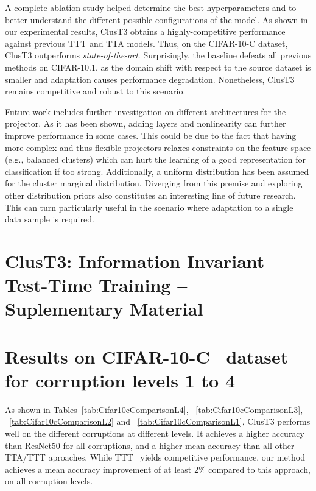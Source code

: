 \documentclass{article}
\begin{document}
A complete ablation study helped determine the best hyperparameters and to better understand the different possible configurations of the model. As shown in our experimental results, ClusT3 obtains a highly-competitive performance against previous TTT and TTA models. Thus, on the CIFAR-10-C dataset, ClusT3 outperforms \emph{state-of-the-art}. Surprisingly, the baseline defeats all previous methods on CIFAR-10.1, as the domain shift with respect to the source dataset is smaller and adaptation causes performance degradation. Nonetheless, ClusT3 remains competitive and robust to this scenario.

Future work includes further investigation on different architectures for the projector. As it has been shown, adding layers and nonlinearity can further improve performance in some cases. This could be due to the fact that having more complex and thus flexible projectors relaxes constraints on the feature space (e.g., balanced clusters) which can hurt the learning of a good representation for classification if too strong. Additionally, a uniform distribution has been assumed for the cluster marginal distribution. Diverging from this premise and exploring other distribution priors also constitutes an interesting line of future research. This can turn particularly useful in the scenario where adaptation to a single data sample is required.

\newpage

\section*{\centering ClusT3: Information Invariant Test-Time Training -- Suplementary Material}

\setcounter{section}{0}

\section{Results on CIFAR-10-C~\cite{cifar10c} dataset for corruption levels 1 to 4}
\label{sec:Results}

As shown in Tables~\ref{tab:Cifar10cComparisonL4}, ~\ref{tab:Cifar10cComparisonL3}, ~\ref{tab:Cifar10cComparisonL2} and ~\ref{tab:Cifar10cComparisonL1}, ClusT3 performs well on the different corruptions at different levels. It achieves a higher accuracy than ResNet50 for all corruptions, and a higher mean accuracy than all other TTA/TTT aproaches. While TTT~\cite{ttt} yields competitive performance, our method achieves a mean accuracy improvement of at least 2\% compared to this approach, on all corruption levels.
\end{document}
